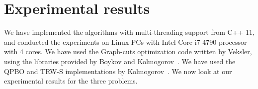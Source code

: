 \section{Experimental results}
\label{section:results} We have implemented the algorithms with
multi-threading support from C++ 11, and conducted the experiments on
Linux PCs with Intel Core i7 4790 processor with 4 cores. We have used
the Graph-cuts optimization code written by Veksler, using the libraries
provided by Boykov and
Kolmogorov~\cite{middlebury_mrf,alpha_expansion,what_energy_can_be_min_by_gc,mrf_experimental}.
%
%
We have used the QPBO and TRW-S implementations by
Kolmogorov~\cite{QPBO, TRW-S_implementation}. We now look at our
experimental results for the three problems.










